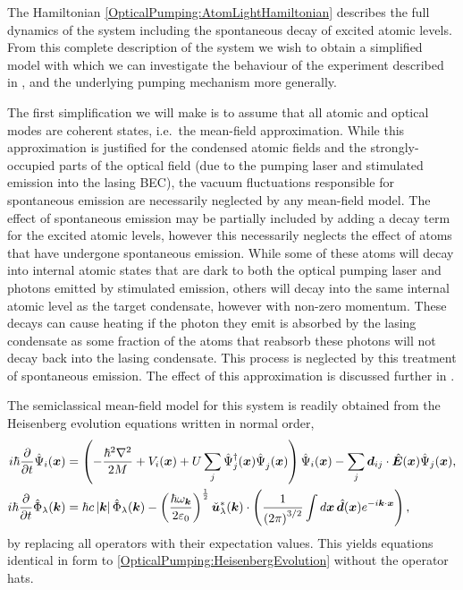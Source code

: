 The Hamiltonian \eqref{OpticalPumping:AtomLightHamiltonian} describes the full dynamics of the system including the spontaneous decay of excited atomic levels.  From this complete description of the system we wish to obtain a simplified model with which we can investigate the behaviour of the experiment described in , and the underlying pumping mechanism more generally.  

The first simplification we will make is to assume that all atomic and optical modes are coherent states, i.e.\ the mean-field approximation.  While this approximation is justified for the condensed atomic fields and the strongly-occupied parts of the optical field (due to the pumping laser and stimulated emission into the lasing BEC), the vacuum fluctuations responsible for spontaneous emission are necessarily neglected by any mean-field model.  The effect of spontaneous emission may be partially included by adding a decay term for the excited atomic levels, however this necessarily neglects the effect of atoms that have undergone spontaneous emission.  While some of these atoms will decay into internal atomic states that are dark to both the optical pumping laser and photons emitted by stimulated emission, others will decay into the same internal atomic level as the target condensate, however with non-zero momentum.  These decays can cause heating if the photon they emit is absorbed by the lasing condensate as some fraction of the atoms that reabsorb these photons will not decay back into the lasing condensate. This process is neglected by this treatment of spontaneous emission.  The effect of this approximation is discussed further in .

The semiclassical mean-field model for this system is readily obtained from the Heisenberg evolution equations written in normal order,
\begin{subequations}
    \label{OpticalPumping:HeisenbergEvolution}
    \begin{align}
        i \hbar \frac{\partial}{\partial t} \hat{\Psi}_i(\vect{x}) &= \left(- \frac{\hbar^2 \nabla^2}{2 M} + V_i(\vect{x}) + U\sum_j\hat{\Psi}_j^\dagger(\vect{x})\hat{\Psi}_j^{\phantom{\dagger}}(\vect{x})\right)\hat{\Psi}_i(\vect{x}) - \sum_{j} \vect{d}_{ij} \cdot \hat{\vect{E}}(\vect{x}) \hat{\Psi}_j(\vect{x}),\\
        i \hbar \frac{\partial}{\partial t} \hat{\Phi}_\lambda(\vect{k}) &= \hbar c \abs{\vect{k}} \hat{\Phi}_\lambda(\vect{k}) - \left(\frac{\hbar \omega_{\vect{k}}}{2 \varepsilon_0}\right)^{\frac{1}{2}} \unitvec{u}_\lambda^*(\vect{k}) \cdot \left( \frac{1}{\left(2\pi\right)^{3/2}} \int d \vect{x}\, \hat{\vect{d}}(\vect{x}) e^{-i \vect{k} \cdot \vect{x}} \right),
    \end{align}
\end{subequations}
by replacing all operators with their expectation values.  This yields equations identical in form to \eqref{OpticalPumping:HeisenbergEvolution} without the operator hats.

